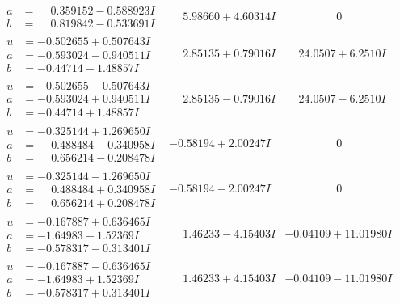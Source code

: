 \documentclass[1p]{elsarticle_modified}
\theoremstyle{definition}
\begin{document}
$$\begin{array}{c|c|c}
\begin{aligned}
a &= \phantom{-}0.359152 - 0.588923 I \\
b &= \phantom{-}0.819842 - 0.533691 I\end{aligned}
 & \phantom{-}5.98660 + 4.60314 I & \phantom{-0.000000 } 0 \\ \hline\begin{aligned}
u &= -0.502655 + 0.507643 I \\
a &= -0.593024 - 0.940511 I \\
b &= -0.44714 - 1.48857 I\end{aligned}
 & \phantom{-}2.85135 + 0.79016 I & \phantom{-}24.0507 + 6.2510 I \\ \hline\begin{aligned}
u &= -0.502655 - 0.507643 I \\
a &= -0.593024 + 0.940511 I \\
b &= -0.44714 + 1.48857 I\end{aligned}
 & \phantom{-}2.85135 - 0.79016 I & \phantom{-}24.0507 - 6.2510 I \\ \hline\begin{aligned}
u &= -0.325144 + 1.269650 I \\
a &= \phantom{-}0.488484 - 0.340958 I \\
b &= \phantom{-}0.656214 - 0.208478 I\end{aligned}
 & -0.58194 + 2.00247 I & \phantom{-0.000000 } 0 \\ \hline\begin{aligned}
u &= -0.325144 - 1.269650 I \\
a &= \phantom{-}0.488484 + 0.340958 I \\
b &= \phantom{-}0.656214 + 0.208478 I\end{aligned}
 & -0.58194 - 2.00247 I & \phantom{-0.000000 } 0 \\ \hline\begin{aligned}
u &= -0.167887 + 0.636465 I \\
a &= -1.64983 - 1.52369 I \\
b &= -0.578317 - 0.313401 I\end{aligned}
 & \phantom{-}1.46233 - 4.15403 I & -0.04109 + 11.01980 I \\ \hline\begin{aligned}
u &= -0.167887 - 0.636465 I \\
a &= -1.64983 + 1.52369 I \\
b &= -0.578317 + 0.313401 I\end{aligned}
 & \phantom{-}1.46233 + 4.15403 I & -0.04109 - 11.01980 I \\ \hline\begin{aligned}

\end{aligned}
\end{array}$$
\end{document}

